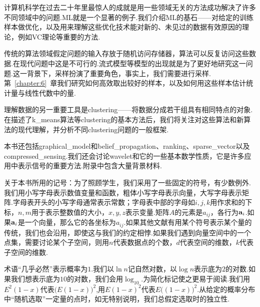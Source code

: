 计算机科学在过去二十年里最惊人的成就是用一些领域无关的方法成功解决了许多不同领域中的问题.\gls{ML}就是一个显著的例子.我们介绍\gls{ML}的基石——对给定的训练样本做优化，以及用来理解这些优化技术能对新的、未见过的数据有效原因的理论，例如\gls{VC}理论等重要的方法.

传统的算法领域假定问题的输入存放于随机访问存储器，算法可以反复访问这些数据.在现代问题中这是不可行的.流式模型等模型的出现就是为了更好地研究这一问题.这一背景下，采样扮演了重要角色，事实上，我们需要进行采样.第~\ref{chapter:6}~章我们研究如何高效取出较好的样本，以及如何用这些样本估计统计量与线性代数中的量.

理解数据的另一重要工具是\gls{clustering}——将数据分成若干组具有相同特点的对象.在描述了\gls{k_means}算法等\gls{clustering}的基本方法后，我们将关注对这些算法和新算法的现代理解，并分析不同\gls{clustering}问题的一般框架.

本书还包括\gls{graphical_model}和\gls{belief_propagation}、\gls{ranking}、\gls{sparse_vector}以及\gls{compressed_sensing}.我们还会讨论\gls{wavelet}和它的一些基本数学性质，它是许多应用中表示信号的重要方法.附录中包含大量背景材料.

关于本书所用的记号：为了照顾学生，我们采用了一些固定的符号，有少数例外.我们用小写字母表示数值变量和函数，粗体小写字母表示向量，大写字母表示矩阵.字母表开头的小写字母通常表示常数；字母表中部的字母如$i,j,k$用作求和的下标，$n,m$用于表示整数值的大小，$x,y,z$表示变量.矩阵$A$的元素是$a_{ij}$，各行为${\mathbf{a}}_i$.如果${\mathbf{a}}_i$是一个向量，那么它的各坐标为$a_{ij}$.如果其他文献有用某个符号表示某个量的传统，我们也会沿用，即使这与我们的约定相悖.如果我们遇到向量空间中的一个点集，需要讨论某个子空间，则用$n$代表数据点的个数，$d$代表空间的维数，$k$代表子空间的维数.

术语“几乎必然”表示概率为$1$.我们以$\ln n$记自然对数，以$\log n$表示底为$2$的对数.如果我们想表示底为$10$的对数，我们会用$\log_{10}$.为简化标记使之更易于阅读.我们用$E^2(1-x)$代表$\big( E(1-x)\big)^2$,用$E(1-x)^2$代表$E\big((1-x)\big)^2$.从给定的概率分布中“随机选取”一定量的点时，如无特别说明，我们总假定选取时的独立性.
\cleardoublepage